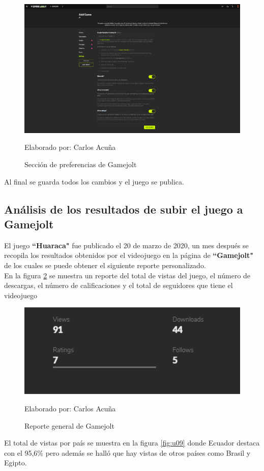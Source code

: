 \documentclass[a4paper, openright, 12pt]{report}
\begin{document}
\begin{itemize}
\begin{figure}[h]
\captionsetup{justification=centering,margin=2cm}
\includegraphics[scale=0.3]{u07}
\centering
\caption{Sección de preferencias de Gamejolt}
Elaborado por: Carlos Acuña
\label{fig:u07}
\end{figure}

\justify
Al final se guarda todos los cambios y el juego se publica.
\clearpage
\end{itemize}
\subsection*{Análisis de los resultados de subir el juego a Gamejolt}
\justify
El juego \textbf{``Huaraca"} fue publicado el 20 de marzo de 2020, un mes después se recopila los resultados obtenidos por el videojuego en la página de \textbf{``Gamejolt"} de los cuales se puede obtener el siguiente reporte personalizado.\\
En la figura \ref{fig:u08} se muestra un reporte del total de vistas del juego, el número de descargas, el número de calificaciones y el total de seguidores que tiene el videojuego

\begin{figure}[h]
\captionsetup{justification=centering,margin=2cm}
\includegraphics[scale=1]{u08}
\centering
\caption{Reporte general de Gamejolt}
Elaborado por: Carlos Acuña
\label{fig:u08}
\end{figure}
\justify
El total de vistas por país se muestra en la figura \ref{fig:u09} donde Ecuador destaca con el 95,6\% pero además se halló que hay vistas de otros países como Brasil y Egipto.
\end{document}
